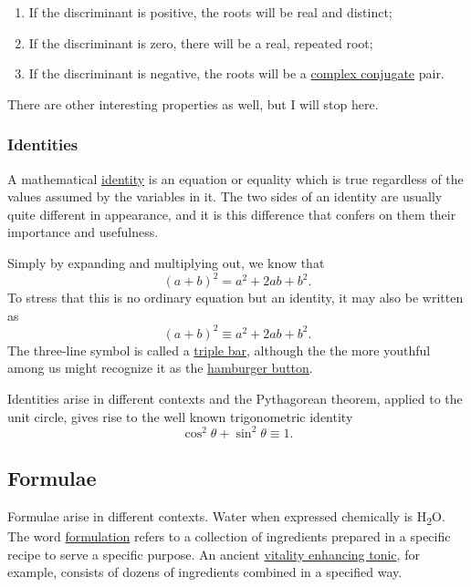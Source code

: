 \documentclass[
  a4paper,
]{article}
\begin{document}
\begin{enumerate}
\def\labelenumi{\alph{enumi}.}
\item
  If the discriminant is positive, the roots will be real and distinct;
\item
  If the discriminant is zero, there will be a real, repeated root;
\item
  If the discriminant is negative, the roots will be a
  \href{https://www.mathcentre.ac.uk/resources/sigma\%20complex\%20number\%20leaflets/sigma-complex6-2009-1.pdf}{complex
  conjugate} pair.
\end{enumerate}

There are other interesting properties as well, but I will stop here.

\subsubsection{Identities}\label{identities}

A mathematical
\href{https://en.wikipedia.org/wiki/Identity_(mathematics)}{identity} is
an equation or equality which is true regardless of the values assumed
by the variables in it. The two sides of an identity are usually quite
different in appearance, and it is this difference that confers on them
their importance and usefulness.

Simply by expanding and multiplying out, we know that \[
(a+b)^2 = a^2 +2ab + b^2. 
\] To stress that this is no ordinary equation but an identity, it may
also be written as \[
(a+b)^2 \equiv a^2 +2ab + b^2.
\] The three-line symbol is called a
\href{https://en.wikipedia.org/wiki/Triple_bar}{triple bar}, although
the the more youthful among us might recognize it as the
\href{https://en.wikipedia.org/wiki/Hamburger_button}{hamburger button}.

Identities arise in different contexts and the Pythagorean theorem,
applied to the unit circle, gives rise to the well known trigonometric
identity \[
\cos^2\theta + \sin^2\theta \equiv 1.
\]

\subsection{Formulae}\label{formulae}

Formulae arise in different contexts. Water when expressed chemically is
H\textsubscript{\(2\)}O. The word
\href{https://www.vocabulary.com/dictionary/formulation}{formulation}
refers to a collection of ingredients prepared in a specific recipe to
serve a specific purpose. An ancient
\href{https://pmc.ncbi.nlm.nih.gov/articles/PMC6571565/\#:~:text=Chyawanprash\%20is\%20formulated\%20by\%20processing,richest\%20source\%20of\%20vitamin\%20C}{vitality
enhancing tonic}, for example, consists of dozens of ingredients
combined in a specified way.
\end{document}
